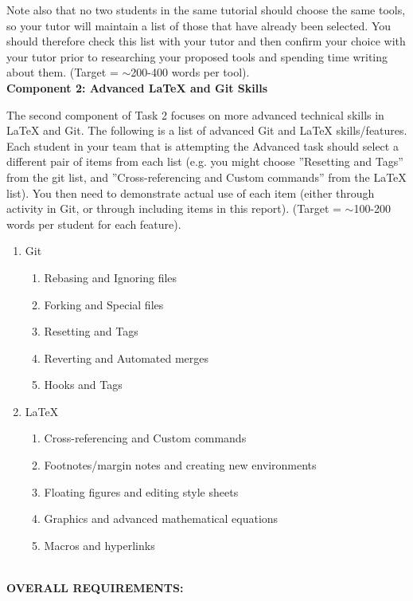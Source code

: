 \documentclass[a4paper, 11pt]{report}
\begin{document}
Note also that no two students in the same tutorial should choose the same tools, so your tutor will maintain a list of those that have already been selected. You should therefore check this list with your tutor and then confirm your choice with your tutor prior to researching your proposed tools and spending time writing about them. (Target = $\sim$200-400 words per tool).\\[2mm]

\textbf{Component 2: Advanced LaTeX and Git Skills}

The second component of Task 2 focuses on more advanced technical skills in LaTeX and Git. The following is a list of advanced Git and LaTeX skills/features. Each student in your team that is attempting the Advanced task should select a different pair of items from each list (e.g. you might choose ''Resetting and Tags'' from the git list, and ''Cross-referencing and Custom commands'' from the LaTeX list). You then need to demonstrate actual use of each item (either through activity in Git, or through including items in this report). (Target = $\sim$100-200 words per student for each feature).

\begin{enumerate}
\item{Git}
	\begin{enumerate}
	\item Rebasing and Ignoring files 
	\item Forking and Special files 
	\item Resetting and Tags 
	\item Reverting and Automated merges 
	\item Hooks and Tags 
	\end{enumerate}
\item LaTeX 
	\begin{enumerate}
	\item Cross-referencing and Custom commands 
	\item Footnotes/margin notes and creating new environments 
	\item Floating figures and editing style sheets 
	\item Graphics and advanced mathematical equations 
	\item Macros and hyperlinks
	\end{enumerate}
\end{enumerate}
~\\[2mm]

\textbf{OVERALL REQUIREMENTS:}
\end{document}

